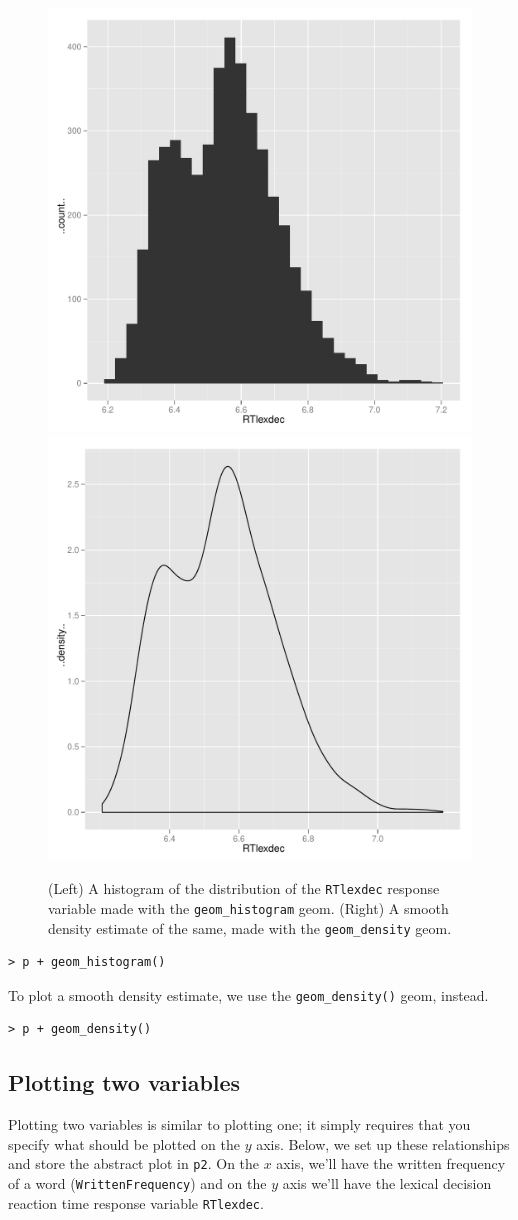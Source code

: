 \documentclass[oneside, 10pt]{article}
\begin{document}
\begin{figure}[htbp]
  \includegraphics[width = 0.5\linewidth]{histogram}%
  \includegraphics[width = 0.5\linewidth]{density}
  \caption{(Left) A histogram of the distribution of the \texttt{RTlexdec} response variable made with the \texttt{geom\_histogram} geom. (Right) A smooth density estimate of the same, made with the \texttt{geom\_density} geom.}
  \label{fig:one}
\end{figure}

\begin{verbatim}
> p + geom_histogram()
\end{verbatim}

To plot a smooth density estimate, we use the \texttt{geom\_density()} geom, instead.

\begin{verbatim}
> p + geom_density()
\end{verbatim}



\subsection{Plotting two variables}

Plotting two variables is similar to plotting one; it simply requires that you specify what should be plotted on the $y$ axis. Below, we set up these relationships and store the abstract plot in \verb!p2!. On the $x$ axis, we'll have the written frequency of a word (\verb!WrittenFrequency!) and on the $y$ axis we'll have the lexical decision reaction time response variable \verb!RTlexdec!.
\end{document}
